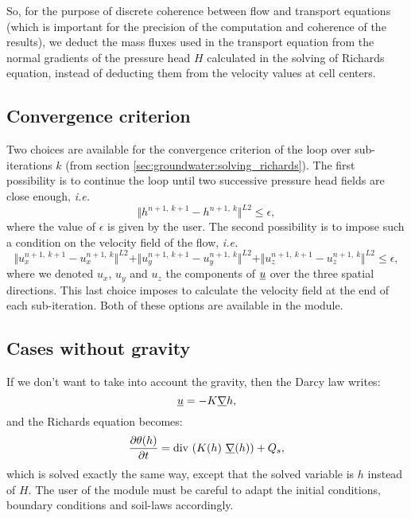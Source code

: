 So, for the purpose of discrete coherence between flow and transport equations (which is important for the precision of the computation and coherence of the results), we deduct the mass fluxes
used in the transport equation from the normal gradients of the pressure head $H$ calculated in the solving of
Richards equation, instead of deducting them from the velocity values at cell centers.

\subsection{Convergence criterion}
Two choices are available for the convergence criterion of the loop over sub-iterations $k$ (from section \ref{sec:groundwater:solving_richards}).
The first possibility is to continue the loop until two successive pressure head fields are close enough, \emph{i.e.}
$$\Vert h^{n + 1, \ k + 1} - h^{n + 1, \ k } \Vert^{L2} \leq \epsilon,$$
where the value of $\epsilon$ is given by the user.
The second possibility is to impose such a condition on the velocity field of the flow, \emph{i.e.}
$$\Vert u_x^{n + 1, \ k + 1} - u_x^{n + 1, \ k } \Vert^{L2}
+ \Vert u_y^{n + 1, \ k + 1} - u_y^{n + 1, \ k } \Vert^{L2}
+ \Vert u_z^{n + 1, \ k + 1} - u_z^{n + 1, \ k } \Vert^{L2} \leq \epsilon,$$
where we denoted $u_x$, $u_y$ and $u_z$ the components of $\underline{u}$ over the three spatial directions.
This last choice imposes to calculate the velocity field at the end of each sub-iteration.
Both of these options are available in the module.

\subsection{Cases without gravity}
If we don't want to take into account the gravity, then the Darcy law writes:
\begin{equation}
\label{darcy_without_gravity}
 \underline{u} = - K \underline{\nabla} h,
\end{equation}
and the Richards equation becomes:
\begin{equation}
 \frac{\partial{\theta(h)}}{\partial{t}} = \text{div}\, \left( K(h) \ \underline{\nabla}(h) \right) + Q_s,
\end{equation}
which is solved exactly the same way, except that the solved variable is $h$ instead of $H$. The user of the module
must be careful to adapt the initial conditions, boundary conditions and soil-laws accordingly.

